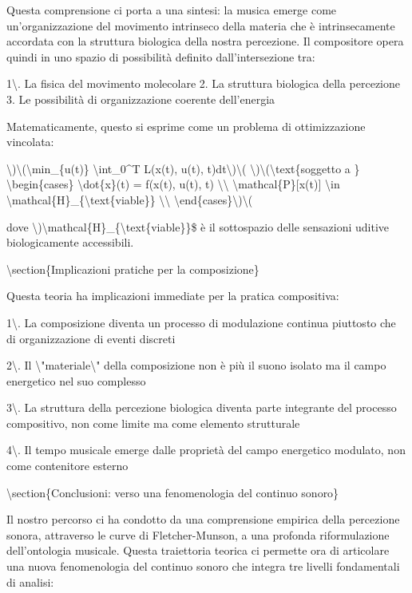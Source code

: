 \documentclass[a4paper,11pt]{article}
\begin{document}
Questa comprensione ci porta a una sintesi: la musica emerge come
un'organizzazione del movimento intrinseco della materia che \`e
intrinsecamente accordata con la struttura biologica della nostra
percezione. Il compositore opera quindi in uno spazio di possibilit\`a
definito dall'intersezione tra:

1\textbackslash{}. La fisica del movimento molecolare 2. La struttura biologica della
percezione 3. Le possibilit\`a di organizzazione coerente dell'energia

Matematicamente, questo si esprime come un problema di ottimizzazione
vincolata:

\textbackslash{})\textbackslash{}(\textbackslash{}min\_\{u(t)\} \textbackslash{}int\_0\textasciicircum{}T L(x(t), u(t), t)dt\textbackslash{})\textbackslash{}(
\textbackslash{})\textbackslash{}(\textbackslash{}text\{soggetto a \} \textbackslash{}begin\{cases\}
\textbackslash{}dot\{x\}(t) = f(x(t), u(t), t) \textbackslash{}\textbackslash{}
\textbackslash{}mathcal\{P\}[x(t)] \textbackslash{}in \textbackslash{}mathcal\{H\}\_\{\textbackslash{}text\{viable\}\} \textbackslash{}\textbackslash{}
\textbackslash{}end\{cases\}\textbackslash{})\textbackslash{}(

dove \textbackslash{})\textbackslash{}mathcal\{H\}\_\{\textbackslash{}text\{viable\}\}\$ \`e il sottospazio delle sensazioni
uditive biologicamente accessibili.

\textbackslash{}section\{Implicazioni pratiche per la composizione\}

Questa teoria ha implicazioni immediate per la pratica compositiva:

1\textbackslash{}. La composizione diventa un processo di modulazione continua
piuttosto che di organizzazione di eventi discreti

2\textbackslash{}. Il \textbackslash{}"materiale\textbackslash{}" della composizione non \`e pi\`u il suono isolato ma il
campo energetico nel suo complesso

3\textbackslash{}. La struttura della percezione biologica diventa parte integrante del
processo compositivo, non come limite ma come elemento strutturale

4\textbackslash{}. Il tempo musicale emerge dalle propriet\`a del campo energetico
modulato, non come contenitore esterno

\textbackslash{}section\{Conclusioni: verso una fenomenologia del continuo sonoro\}

Il nostro percorso ci ha condotto da una comprensione empirica della
percezione sonora, attraverso le curve di Fletcher-Munson, a una
profonda riformulazione dell'ontologia musicale. Questa traiettoria
teorica ci permette ora di articolare una nuova fenomenologia del
continuo sonoro che integra tre livelli fondamentali di analisi:
\end{document}
